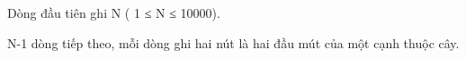 Dòng đầu tiên ghi N ( 1 ≤ N ≤ 10000).


N-1 dòng tiếp theo, mỗi dòng ghi hai nút là hai đầu mút của một cạnh thuộc cây.